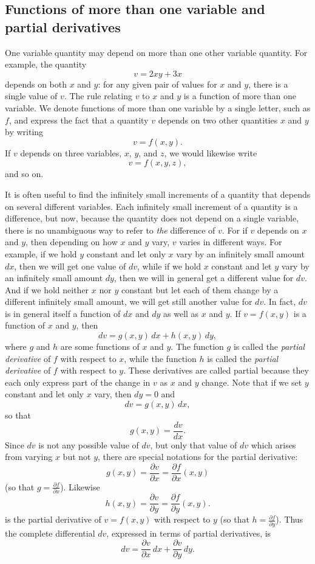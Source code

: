 \documentclass[polutonikogreek,english,twoside,openright]{article}
\begin{document}
\subsection*{Functions of more than one variable and partial derivatives}

One variable quantity may depend on more than one other variable
quantity.  For example, the quantity
$$v = 2xy + 3x$$
depends on both $x$ and $y$: for any given pair of values for $x$ and
$y$, there is a single value of $v$.  The rule relating $v$ to $x$ and
$y$ is a function of more than one variable.  We denote functions of
more than one variable by a single letter, such as $f$, and express
the fact that a quantity $v$ depends on two other quantities $x$ and
$y$ by writing
$$v = f(x,y).$$
If $v$ depends on three variables, $x$, $y$, and $z$, we would
likewise write
$$v = f(x,y,z),$$
and so on.

It is often useful to find the infinitely small increments of a quantity that depends on several different variables.  Each infinitely small increment of a quantity is a difference, but now, because the quantity does not depend on a single variable, there is no unambiguous way to refer to {\em the}
difference of $v$.  For if $v$ depends on $x$ and $y$, then depending
on how $x$ and $y$ vary, $v$ varies in different ways.  For example,
if we hold $y$ constant and let only $x$ vary by an infinitely small
amount $dx$, then we will get one value of $dv$, while if we hold $x$
constant and let $y$ vary by an infinitely small amount $dy$, then we
will in general get a different value for $dv$.  And if we hold
neither $x$ nor $y$ constant but let each of them change by a
different infinitely small amount, we will get still another value for
$dv$.  In fact, $dv$ is in general itself a function of $dx$ and $dy$
as well as $x$ and $y$.  If $v = f(x,y)$ is a function of $x$ and $y$,
then
$$dv = g(x,y)\,dx + h(x,y)\,dy,$$
where $g$ and $h$ are some functions of $x$ and $y$.  The function $g$
is called the {\em partial derivative} of $f$ with respect to $x$,
while the function $h$ is called the {\em partial derivative} of $f$
with respect to $y$.  These derivatives are called partial because they each only express part of the change in $v$ as $x$ and $y$ change.  Note that if we set $y$ constant and let only
$x$ vary, then $dy =0$ and
$$dv = g(x,y)\,dx,$$
so that 
$$g(x,y) = \frac{dv}{dx}.$$
Since $dv$ is not any possible value of $dv$, but only that value of
$dv$ which arises from varying $x$ but not $y$, there are special
notations for the partial derivative:
$$g(x,y) = \frac{\partial v}{\partial x} = \frac{\partial f}{\partial x}(x,y)$$
(so that  $\displaystyle g = \frac{\partial f}{\partial x}$).
Likewise
$$h(x,y) = \frac{\partial v}{\partial y}= \frac{\partial f}{\partial y}(x,y).$$
is the partial derivative of $v = f(x,y)$ with respect to $y$ (so that
$\displaystyle h = \frac{\partial f}{\partial y}$).  Thus the complete
differential $dv$, expressed in terms of partial derivatives, is
$$dv =  \frac{\partial v}{\partial x} \,dx +  \frac{\partial v}{\partial y} \,dy.$$
\end{document}
